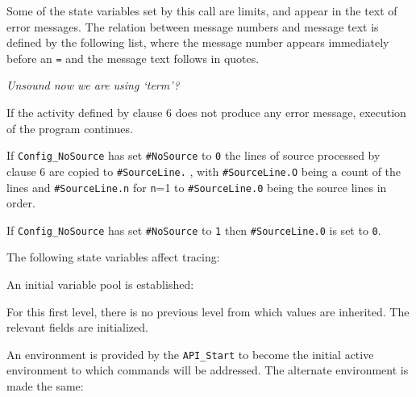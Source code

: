 Some of the state variables set by this call are limits, and appear in
the text of error messages. The relation between message numbers and
message text is defined by the following list, where the message number
appears immediately before an
\texttt{\textquotesingle{}=\textquotesingle{}} and the message text
follows in quotes.



\emph{Unsound now we are using `term'?}



If the activity defined by clause 6 does not produce any error message,
execution of the program continues.



If \texttt{Config\_NoSource} has set \texttt{\#NoSource} to
\texttt{\textquotesingle{}0\textquotesingle{}} the lines of source
processed by clause 6 are copied to \texttt{\#SourceLine.} , with
\texttt{\#SourceLine.O} being a count of the lines and
\texttt{\#SourceLine.n} for \texttt{n}=1 to \texttt{\#SourceLine.0}
being the source lines in order.

If \texttt{Config\_NoSource} has set \texttt{\#NoSource} to
\texttt{\textquotesingle{}1\textquotesingle{}} then
\texttt{\#SourceLine.0} is set to \texttt{0}.

The following state variables affect tracing:



An initial variable pool is established:



For this first level, there is no previous level from which values are
inherited. The relevant fields are initialized.



An environment is provided by the \texttt{API\_Start} to become the
initial active environment to which commands will be addressed. The
alternate environment is made the same:

